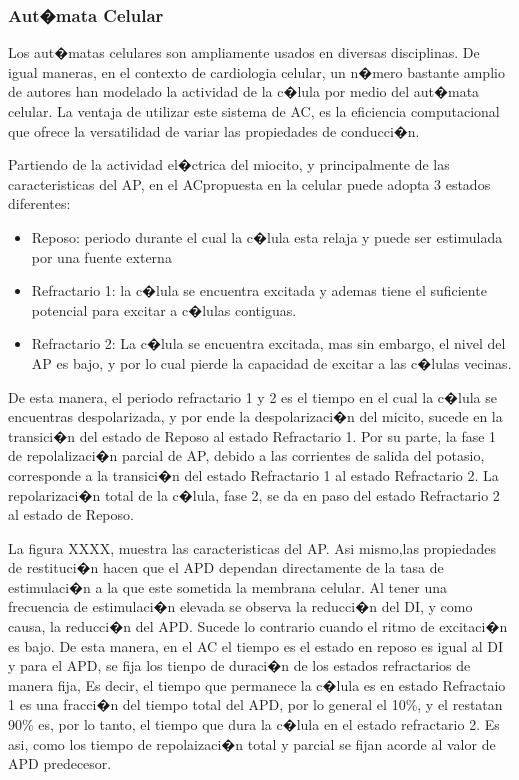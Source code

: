  
\subsubsection{Aut�mata Celular } 


Los aut�matas celulares son ampliamente usados en diversas disciplinas. De igual
maneras, en el contexto de cardiologia celular, un n�mero bastante amplio de
autores han modelado la actividad de la c�lula por medio del aut�mata celular.
La ventaja de utilizar este sistema de \ac{AC}, es la eficiencia
computacional que ofrece la versatilidad de variar las propiedades de conducci�n.

Partiendo de la actividad el�ctrica del miocito,  y principalmente de las
caracteristicas del \ac{AP}, en el \ac{AC}propuesta en 
\cite{Alonso-Atienza05} la celular puede adopta 3 estados diferentes:


\begin{itemize}
\item Reposo: periodo  durante el cual la c�lula esta relaja  y puede ser
estimulada por una fuente externa 
\item Refractario 1: la c�lula se encuentra excitada  y ademas tiene el
suficiente potencial para excitar a c�lulas contiguas.
\item Refractario 2: La c�lula se encuentra excitada, mas sin embargo, el nivel
del \ac{AP} es bajo, y por lo cual pierde la capacidad de excitar a las c�lulas
vecinas.
\end{itemize}

De esta manera, el periodo refractario 1 y 2 es el tiempo  en el cual la c�lula
se encuentras despolarizada, y  por ende la despolarizaci�n del micito, sucede
en la transici�n del estado de Reposo al estado Refractario 1. Por su parte, la
fase 1 de repolalizaci�n parcial de \ac{AP}, debido a las corrientes de salida
del potasio, corresponde a la transici�n del estado Refractario 1 al estado
Refractario 2. La repolarizaci�n total de la c�lula, fase 2, se da en paso del
estado Refractario 2 al estado de Reposo. 


La figura XXXX, muestra las caracteristicas del \ac{AP}. Asi mismo,las
propiedades de restituci�n hacen que el \ac{APD} dependan directamente de la
tasa de estimulaci�n a la que este sometida la membrana celular. Al tener una
frecuencia de estimulaci�n elevada  se observa la reducci�n del \ac{DI}, y como causa, la
reducci�n del \ac{APD}. Sucede lo contrario cuando el ritmo de excitaci�n es
bajo. De esta manera, en el \ac{AC} el tiempo es el estado en reposo es
igual al \ac{DI} y para el \ac{APD}, se fija los tienpo de duraci�n de los
estados refractarios de manera fija, Es decir, el tiempo que permanece
la c�lula es en estado Refractaio 1 es una fracci�n del tiempo total del
\ac{APD}, por lo general el 10\%, y el restatan 90\% es, por lo tanto, el tiempo
que dura la c�lula en el estado refractario 2. Es asi, como los tiempo de
repolaizaci�n total y parcial se fijan acorde al valor de \ac{APD} predecesor.


